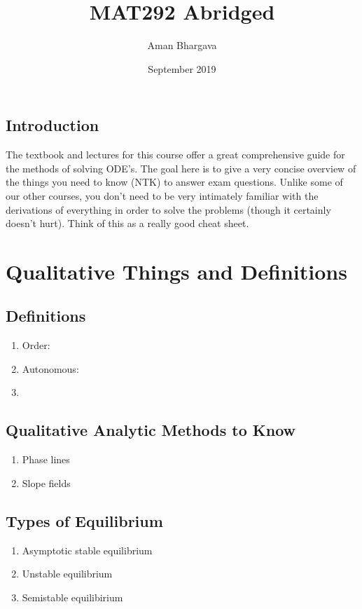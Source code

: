 \documentclass[a4paper,12pt]{report}
\begin{document}
\title{MAT292 Abridged}
\author{Aman Bhargava}
\date{September 2019}
\maketitle

\tableofcontents

\section{Introduction}
The textbook and lectures for this course offer a great comprehensive guide for the 
methods of solving ODE's. The goal here is to give a very concise overview of the things you 
need to know (NTK) to answer exam questions. Unlike
some of our other courses, you don't need to be very intimately familiar with the derivations
of everything in order to solve the problems (though it certainly doesn't hurt). Think of this 
as a really good cheat sheet.

\chapter{Qualitative Things and Definitions}
\section{Definitions}
\begin{enumerate}
\item Order:
\item Autonomous:
\item 
\end{enumerate}


\section{Qualitative Analytic Methods to Know}
\begin{enumerate}
\item Phase lines
\item Slope fields
\end{enumerate}

\section{Types of Equilibrium}
\begin{enumerate}
\item Asymptotic stable equilibrium 
\item Unstable equilibrium 
\item Semistable equilibirium
\end{enumerate}
\end{document}
